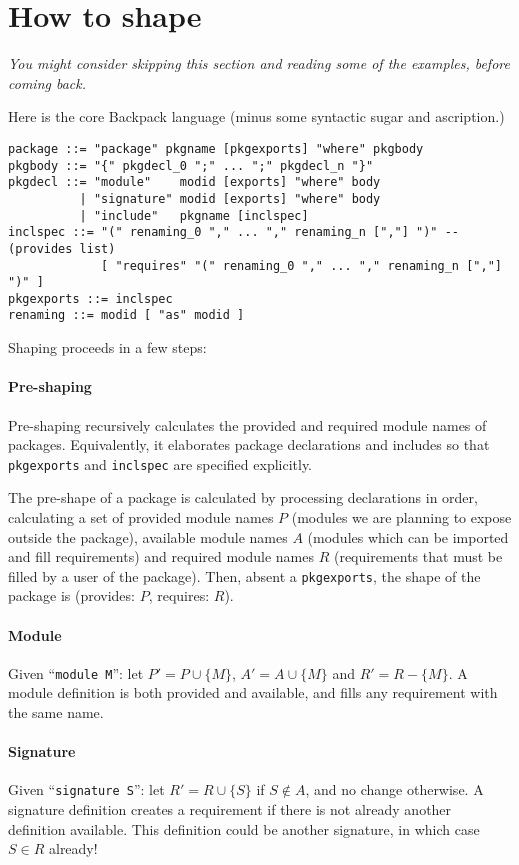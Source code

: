 \documentclass{article}
\begin{document}
\section{How to shape}

\emph{You might consider skipping this section and reading some of the
examples, before coming back.}

Here is the core Backpack language (minus some syntactic sugar and
ascription.)

\begin{verbatim}
package ::= "package" pkgname [pkgexports] "where" pkgbody
pkgbody ::= "{" pkgdecl_0 ";" ... ";" pkgdecl_n "}"
pkgdecl ::= "module"    modid [exports] "where" body
          | "signature" modid [exports] "where" body
          | "include"   pkgname [inclspec]
inclspec ::= "(" renaming_0 "," ... "," renaming_n [","] ")" -- (provides list)
             [ "requires" "(" renaming_0 "," ... "," renaming_n [","] ")" ]
pkgexports ::= inclspec
renaming ::= modid [ "as" modid ]
\end{verbatim}

Shaping proceeds in a few steps:

\paragraph{Pre-shaping}  Pre-shaping recursively calculates the provided
and required module names of packages.  Equivalently, it elaborates
package declarations and includes so that \verb|pkgexports| and
\verb|inclspec| are specified explicitly.

The pre-shape of a package is calculated by processing declarations in
order, calculating a set of provided module names $P$ (modules we are
planning to expose outside the package), available module names $A$
(modules which can be imported and fill requirements) and required
module names $R$ (requirements that must be filled by a user of the
package).  Then, absent a \verb|pkgexports|, the shape of the package is
(provides: $P$, requires: $R$).

\paragraph{Module} Given ``\verb|module M|'': let $P' = P \cup \{M\}$, $A' = A \cup \{M\}$ and $R' = R - \{M\}$. A module definition is both provided and available, and fills any requirement with the same name.

\paragraph{Signature} Given ``\verb|signature S|'': let $R' = R \cup \{S\}$ if $S \notin A$, and no change otherwise. A signature definition creates a requirement if there is not already another definition available.  This definition could be another signature, in which case $S \in R$ already!
\end{document}
